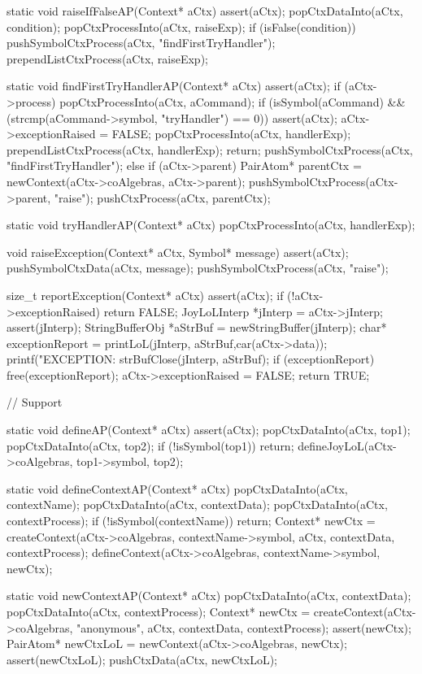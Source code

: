 static void raiseIfFalseAP(Context* aCtx) {
  assert(aCtx);
  popCtxDataInto(aCtx, condition);
  popCtxProcessInto(aCtx, raiseExp);
  if (isFalse(condition)) {
    pushSymbolCtxProcess(aCtx, "findFirstTryHandler");
    prependListCtxProcess(aCtx, raiseExp);
  }
}

static void findFirstTryHandlerAP(Context* aCtx) {
  assert(aCtx);
  if (aCtx->process) {
    popCtxProcessInto(aCtx, aCommand);
    if (isSymbol(aCommand) && (strcmp(aCommand->symbol, "tryHandler") == 0)) {
      assert(aCtx);
      aCtx->exceptionRaised = FALSE;
      popCtxProcessInto(aCtx, handlerExp);
      prependListCtxProcess(aCtx, handlerExp);
      return;
    }
    pushSymbolCtxProcess(aCtx, "findFirstTryHandler");
  } else {
    if (aCtx->parent) {
      PairAtom* parentCtx = newContext(aCtx->coAlgebras, aCtx->parent);
      pushSymbolCtxProcess(aCtx->parent, "raise");
      pushCtxProcess(aCtx, parentCtx);
    }
  }
}

static void tryHandlerAP(Context* aCtx) {
  popCtxProcessInto(aCtx, handlerExp);
}

void raiseException(Context* aCtx, Symbol* message) {
  assert(aCtx);
  pushSymbolCtxData(aCtx, message);
  pushSymbolCtxProcess(aCtx, "raise");
}

size_t reportException(Context* aCtx) {
  assert(aCtx);
  if (!aCtx->exceptionRaised) return FALSE;
  JoyLoLInterp *jInterp = aCtx->jInterp;
  assert(jInterp);
  StringBufferObj *aStrBuf = 
    newStringBuffer(jInterp);
  char* exceptionReport = 
    printLoL(jInterp, aStrBuf,car(aCtx->data));
  printf("\nUNHANDLED EXCEPTION: %
  strBufClose(jInterp, aStrBuf);
  if (exceptionReport) free(exceptionReport);
  aCtx->exceptionRaised = FALSE;
  return TRUE;
}

// Support

static void defineAP(Context* aCtx) {
  assert(aCtx);
  popCtxDataInto(aCtx, top1);
  popCtxDataInto(aCtx, top2);
  if (!isSymbol(top1)) return;
  defineJoyLoL(aCtx->coAlgebras, top1->symbol, top2);
}

static void defineContextAP(Context* aCtx) {
  popCtxDataInto(aCtx, contextName);
  popCtxDataInto(aCtx, contextData);
  popCtxDataInto(aCtx, contextProcess);
  if (!isSymbol(contextName)) return;
  Context* newCtx =
    createContext(aCtx->coAlgebras, contextName->symbol,
                  aCtx, contextData, contextProcess);
  defineContext(aCtx->coAlgebras, contextName->symbol, newCtx);
}

static void newContextAP(Context* aCtx) {
  popCtxDataInto(aCtx, contextData);
  popCtxDataInto(aCtx, contextProcess);
  Context* newCtx =
    createContext(aCtx->coAlgebras, "anonymous",
                  aCtx, contextData, contextProcess);
  assert(newCtx);
  PairAtom* newCtxLoL = newContext(aCtx->coAlgebras, newCtx);
  assert(newCtxLoL);
  pushCtxData(aCtx, newCtxLoL);
}


